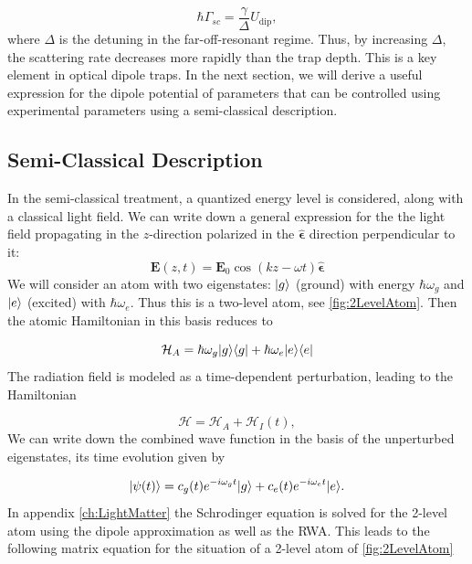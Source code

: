 \begin{equation}\label{eq:RelationUG}
    \hbar \Gamma_{sc} =\frac{\gamma}{\Delta} U_{\text{dip}},
\end{equation}
where $\Delta$ is the detuning in the far-off-resonant regime. 
Thus, by increasing $\Delta$, the scattering rate decreases more rapidly than the trap depth. 
This is a key element in optical dipole traps. 
In the next section, we will derive a useful expression for the dipole potential of parameters that can be controlled using experimental parameters using a semi-classical description.

\subsection{Semi-Classical Description}

In the semi-classical treatment, a quantized energy level is considered, along with a classical light field. 
We can write down a general expression for the the light field propagating in the $z$-direction polarized in the $\bm{\hat{\epsilon}}$ direction perpendicular to it:
\begin{equation}\label{eq:ClassicalField}
	\mathbf{E}(z,t) = \mathbf{E}_0 \cos{(k z - \omega t)} 	\bm{\hat{\epsilon}}
\end{equation}
We will consider an atom with two eigenstates: $\lvert g\rangle$ (ground) with energy $\hbar \omega_g$ and $\lvert e\rangle$ (excited) with $\hbar \omega_e$.
Thus this is a two-level atom, see \cref{fig:2LevelAtom}. 
Then the atomic Hamiltonian in this basis reduces to \cite{Loudon2000}


\begin{equation}\label{eq:AtomHamiltonianMain}
	\mathcal{H}_A = \hbar \omega_g \lvert g\rangle\langle g\rvert + \hbar \omega_e \lvert e\rangle\langle e\rvert
\end{equation}
The radiation field is modeled as a time-dependent perturbation, leading to the Hamiltonian \cite{Leeuwen2017}

\begin{equation}\label{eq:PerturbationMain}
	\mathcal{H} = \mathcal{H}_A + \mathcal{H}_{I}(t),
\end{equation}
We can write down the combined wave function in the basis of the unperturbed eigenstates, its time evolution given by

\begin{equation}\label{eq:TwoLevelMain}
	\lvert\psi(t)\rangle = c_g(t) e^{-i \omega_g t} \lvert g\rangle + c_e(t) e^{-i \omega_e t} \lvert e\rangle.
\end{equation}
In appendix \ref{ch:LightMatter} the Schrodinger equation is solved for the 2-level atom using the dipole approximation as well as the \ac{RWA}. 
This leads to the following matrix equation for the situation of a 2-level atom of \cref{fig:2LevelAtom} \cite{Foot2005}

